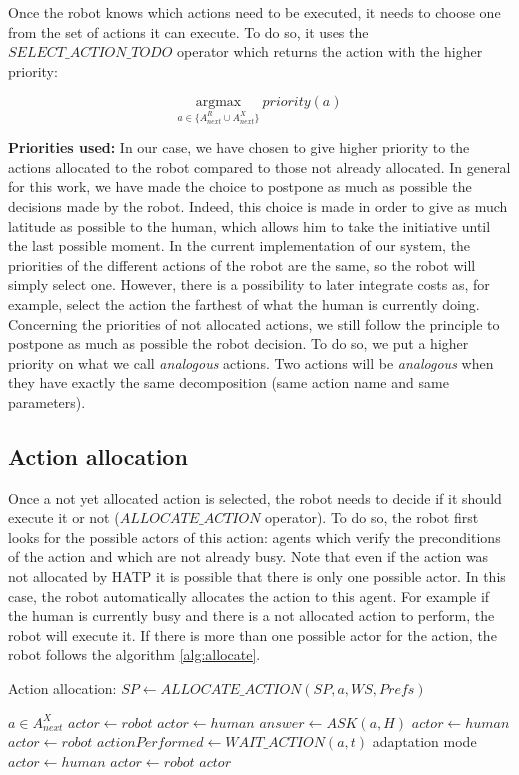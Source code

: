 \documentclass[english,a4paper,11pt,twoside]{StyleThese}
\begin{document}
Once the robot knows which actions need to be executed, it needs to choose one from the set of actions it can execute. To do so, it uses the $SELECT\_ACTION\_TODO$ operator which returns the action with the higher priority:

$$\underset{a \in \{A^R_{next} \cup A^X_{next}\}}{\mathrm{argmax}} \ priority(a)$$

\textbf{Priorities used:}
In our case, we have chosen to give higher priority to the actions allocated to the robot compared to those not already allocated. In general for this work, we have made the choice to postpone as much as possible the decisions made by the robot. Indeed, this choice is made in order to give as much latitude as possible to the human, which allows him to take the initiative until the last possible moment. In the current implementation of our system, the priorities of the different actions of the robot are the same, so the robot will simply select one. However, there is a possibility to later integrate costs as, for example, select the action the farthest of what the human is currently doing. Concerning the priorities of not allocated actions, we still follow the principle to postpone as much as possible the robot decision. To do so, we put a higher priority on what we call \textit{analogous} actions. Two actions will be \textit{analogous} when they have exactly the same decomposition (same action name and same parameters). 

\subsection{Action allocation}
\label{subsec:allocation}

Once a not yet allocated action is selected, the robot needs to decide if it should execute it or not ($ALLOCATE\_ACTION$ operator). To do so, the robot first looks for the possible actors of this action: agents which verify the preconditions of the action and which are not already busy. Note that even if the action was not allocated by HATP it is possible that there is only one possible actor. In this case, the robot automatically allocates the action to this agent. For example if the human is currently busy and there is a not allocated action  to perform, the robot will execute it. If there is more than one possible actor for the action, the robot follows the algorithm \ref{alg:allocate}.

\begin{algorithm}
\caption{Action allocation: $SP \leftarrow ALLOCATE\_ACTION(SP, a, WS, Prefs)$}
\label{alg:allocate}
\begin{algorithmic}
\REQUIRE $a \in A^X_{next}$
\STATE $actor \leftarrow robot$
\STATE $actor \leftarrow human$
\STATE $answer \leftarrow ASK(a, H)$
\STATE $actor \leftarrow human$
\ELSE
\STATE $actor \leftarrow robot$
\ENDIF
\ELSE
\STATE $actionPerformed \leftarrow WAIT\_ACTION(a, t)$
\COMMENT adaptation mode
\STATE $actor \leftarrow human$
\ELSE
\STATE $actor \leftarrow robot$
\ENDIF
\ENDIF
\RETURN $actor$
\end{algorithmic}
\end{algorithm}
\end{document}
